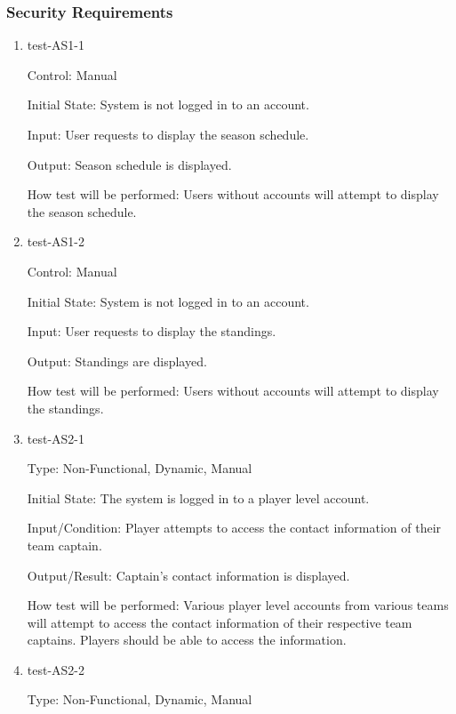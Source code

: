 \documentclass[12pt, titlepage]{article}
\begin{document}
\subsubsection{Security Requirements}

\begin{enumerate}

  \item{test-AS1-1\\}

  Control: Manual

  Initial State: System is not logged in to an account.

  Input: User requests to display the season schedule.

  Output: Season schedule is displayed.

  How test will be performed: Users without accounts will attempt to display
  the season schedule.

  \item{test-AS1-2\\}

  Control: Manual

  Initial State: System is not logged in to an account.

  Input: User requests to display the standings.

  Output: Standings are displayed.

  How test will be performed: Users without accounts will attempt to display
  the standings.

  \item{test-AS2-1\\}

  Type: Non-Functional, Dynamic, Manual

  Initial State: The system is logged in to a player level account.

  Input/Condition: Player attempts to access the contact information of their 
  team captain.

  Output/Result: Captain's contact information is displayed.

  How test will be performed: Various player level accounts from various teams 
  will attempt to access the contact information of their respective team
  captains. Players should be able to access the information.

  \item{test-AS2-2\\}

  Type: Non-Functional, Dynamic, Manual


\end{enumerate}
\end{document}
